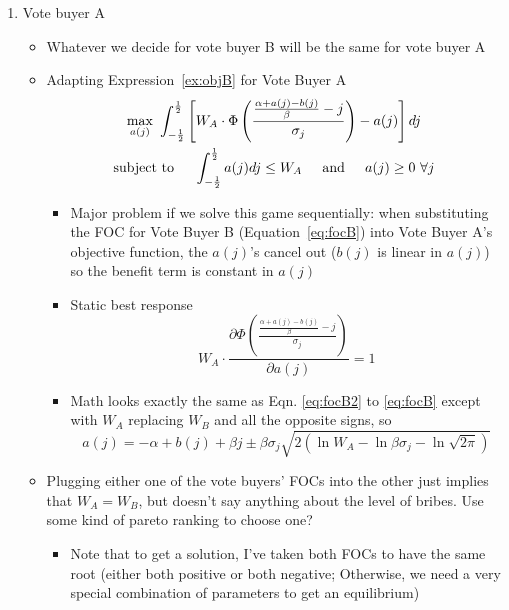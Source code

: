 \documentclass[12pt]{article}
\begin{document}
\begin{enumerate}
\begin{itemize}
\begin{itemize}
				\end{itemize}
		\end{itemize}	
	\item Vote buyer A
		\begin{itemize}
			\item Whatever we decide for vote buyer B will be the same for vote buyer A
			\item Adapting Expression~\ref{ex:objB} for Vote Buyer A
				\begin{multline}
					\max_{a(j)} \ \int_{-\frac{1}{2}}^\frac{1}{2} \left[ W_A \cdot \Phi \left(\frac{\frac{\alpha + a(j) - b(j)}{\beta} - j}{\sigma_j} \right) - a(j) \right] dj \\
						\text{subject to} \hskip.2in \int_{-\frac{1}{2}}^\frac{1}{2} a(j) dj \leq W_A  \hskip.2in \text{and} \hskip.2in a(j)\geq0 \ \forall j
							\label{ex:objA}
				\end{multline}
					\begin{itemize}
						\item Major problem if we solve this game sequentially: when substituting the FOC for Vote Buyer B (Equation~\ref{eq:focB}) into Vote Buyer A's objective function, the $a(j)$'s cancel out ($b(j)$ is linear in $a(j)$) so the benefit term is constant in $a(j)$
						\item Static best response
						  \begin{equation}
								  W_A \cdot \frac{ \partial \Phi \left(\frac{\frac{\alpha + a(j) - b(j)}{\beta} - j}{\sigma_j} \right)}{\partial a(j)} = 1
									\label{eq:focA}
							\end{equation}
						\item Math looks exactly the same as Eqn. \ref{eq:focB2} to \ref{eq:focB} except with $W_A$ replacing $W_B$ and all the opposite signs, so
							\begin{equation}
								a(j) = -\alpha + b(j)  + \beta j \pm \beta\sigma_j \sqrt{2 \left(\ln W_A - \ln \beta\sigma_j - \ln \sqrt{2\pi} \right)}
									\label{eq:focA3}
							\end{equation}		
					\end{itemize}
				\item Plugging either one of the vote buyers' FOCs into the other just implies that $W_A = W_B$, but doesn't say anything about the level of bribes. Use some kind of pareto ranking to choose one?
					\begin{itemize}
						\item Note that to get a solution, I've taken both FOCs to have the same root (either both positive or both negative; Otherwise, we need a very special combination of parameters to get an equilibrium)

\end{itemize}
\end{itemize}
\end{enumerate}
\end{document}
